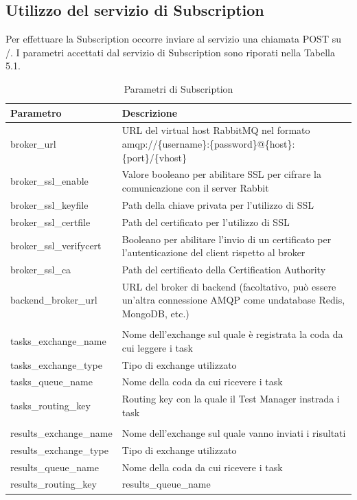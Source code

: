 \subsection{Utilizzo del servizio di Subscription}
Per effettuare la Subscription occorre inviare al servizio una chiamata POST su /.
I parametri accettati dal servizio di Subscription sono riporati nella Tabella 5.1.
\begin{table}[h]
\centering
\begin{tabular}{| m{4.4cm}| m{9cm} | }
\hline
\textbf{Parametro} & \textbf{Descrizione} \\ \hline
broker\_url & URL del virtual host RabbitMQ nel formato \newline amqp://\{username\}:\{password\}@\{host\}:\{port\}/\newline\{vhost\} \\ \hline
broker\_ssl\_enable & Valore booleano per abilitare SSL per cifrare la comunicazione con il server Rabbit \\ \hline
broker\_ssl\_keyfile & Path della chiave privata per l'utilizzo di SSL \\ \hline
broker\_ssl\_certfile & Path del certificato per l'utilizzo di SSL \\ \hline
broker\_ssl\_verifycert & Booleano per abilitare l'invio di un certificato per l'autenticazione del client rispetto al broker \\ \hline
broker\_ssl\_ca & Path del certificato della Certification Authority \\ \hline
backend\_broker\_url & URL del broker di backend (facoltativo, può \newline essere un'altra connessione AMQP come un\newline database Redis, MongoDB, etc.) \\ \hline
 &  \\ \hline
tasks\_exchange\_name & Nome dell'exchange sul quale è registrata la coda da cui leggere i task \\ \hline
tasks\_exchange\_type & Tipo di exchange utilizzato \\ \hline
tasks\_queue\_name & Nome della coda da cui ricevere i task \\ \hline
tasks\_routing\_key & Routing key con la quale il Test Manager instrada i task \\ \hline
 &  \\ \hline
results\_exchange\_name & Nome dell'exchange sul quale vanno inviati i risultati \\ \hline
results\_exchange\_type & Tipo di exchange utilizzato \\ \hline
results\_queue\_name & Nome della coda da cui ricevere i task \\ \hline
results\_routing\_key & results\_queue\_name \\ \hline
\end{tabular}
\caption{Parametri di Subscription}
\label{tab:subscription_parameters}
\end{table}
